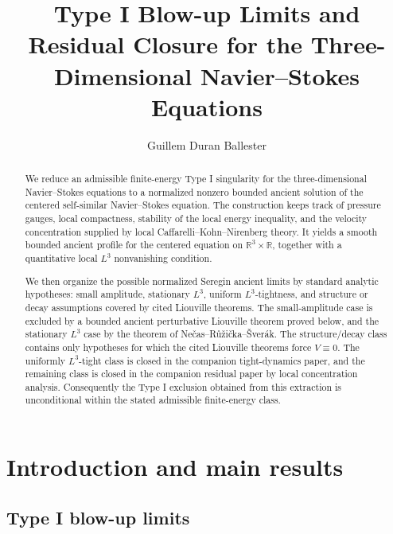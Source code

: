 \documentclass[11pt]{amsart}
\title[Type I blow-up limits and residual closure]
{Type I Blow-up Limits and Residual Closure for the
Three-Dimensional Navier--Stokes Equations}
\author{Guillem Duran Ballester}
\date{}
\theoremstyle{plain}
\theoremstyle{definition}
\theoremstyle{remark}
\numberwithin{equation}{section}
\newcommand{\R}{\mathbb R}
\begin{document}
\begin{abstract}
We reduce an admissible finite-energy Type I singularity for the
three-dimensional Navier--Stokes equations to a normalized nonzero bounded
ancient solution of the centered self-similar Navier--Stokes equation.  The
construction keeps track of pressure gauges, local compactness, stability of
the local energy inequality, and the velocity concentration supplied by local
Caffarelli--Kohn--Nirenberg theory.  It yields a smooth bounded ancient profile
for the centered equation on \(\R^3\times\R\), together with a quantitative
local \(L^3\) nonvanishing condition.

We then organize the possible normalized Seregin ancient limits by standard
analytic hypotheses: small amplitude, stationary \(L^3\), uniform
\(L^3\)-tightness, and structure or decay assumptions covered by cited
Liouville theorems.  The small-amplitude case is excluded by a bounded ancient
perturbative Liouville theorem proved below, and the stationary \(L^3\) case by
the theorem of Ne\v{c}as--R\r{u}\v{z}i\v{c}ka--\v{S}ver\'ak.  The
structure/decay class contains only hypotheses for which the cited Liouville
theorems force \(V\equiv0\).  The uniformly \(L^3\)-tight class is closed in
the companion tight-dynamics paper, and the remaining class is closed in the
companion residual paper by local concentration analysis.  Consequently the
Type I exclusion obtained from this extraction is unconditional within the
stated admissible finite-energy class.
\end{abstract}

\maketitle

\section{Introduction and main results}\label{sec:introduction}

\subsection{Type I blow-up limits}
\end{document}
